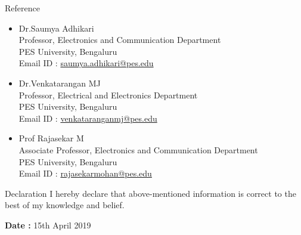 \documentclass{resume} %
\begin{document}
\begin{rSection}{Reference}
\begin{itemize}
	\item Dr.Saumya Adhikari\\
		Professor, Electronics and Communication Department\\
		PES University, Bengaluru\\
		Email ID : \href {https://faculty.pes.edu/p10110}{saumya.adhikari@pes.edu} \\

	\item Dr.Venkatarangan MJ\\
		Professor, Electrical and Electronics Department\\
		PES University, Bengaluru\\
		Email ID : \href{http://13.232.26.175/p10106}{venkataranganmj@pes.edu} \\

	\item Prof Rajasekar M\\
		Associate Professor, Electronics and Communication Department\\
		PES University, Bengaluru\\
		Email ID :  \href{https://faculty.pes.edu/p10125}{rajasekarmohan@pes.edu} \\
\end{itemize}
\end{rSection}

\begin{rSection}{Declaration}
I hereby declare that above-mentioned information is correct to the best of my knowledge and belief. \\
\end{rSection}

{\bf Date : } 15th April 2019
\end{document}
